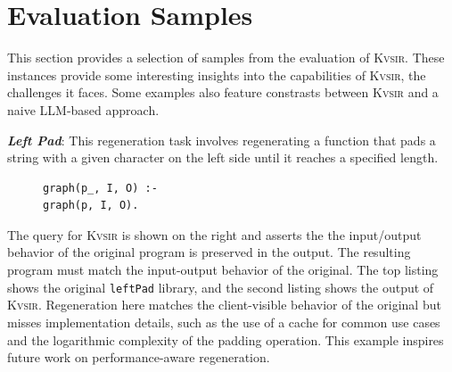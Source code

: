\documentclass[sigplan,review,anonymous,10pt]{acmart}
\newcommand{\sys}{{\scshape Kv{\textalpha}sir}\xspace}
\newcommand{\heading}[1]{\vspace{2pt}\noindent\textbf{\emph{#1}}:\enspace}
\newcommand{\ttt}[1]{\texttt{#1}\xspace}
\begin{document}




\appendix

\section{Evaluation Samples}
This section provides a selection of samples from the evaluation of \sys.
These instances provide some interesting insights into the capabilities of \sys, the challenges it faces.
Some examples also feature constrasts between \sys and a naive LLM-based approach.

\heading{Left Pad}
This regeneration task involves regenerating a
function that pads a string with a given character on the left side until it
reaches a specified length.
\begin{figure}
\begin{verbatim}
graph(p_, I, O) :-
graph(p, I, O).
\end{verbatim}
\end{figure}
The query for \sys is shown on the right and asserts the the input/output behavior of the
original program is preserved in the output.
The resulting program must match the input-output behavior of the original.
The top listing shows the original \ttt{leftPad} library, and the second listing shows the output
of \sys.
Regeneration here matches the client-visible behavior of the original but misses
implementation details, such as the use of a cache for common
use cases and the logarithmic complexity of the padding operation.
This example inspires future work on performance-aware regeneration.
\end{document}

